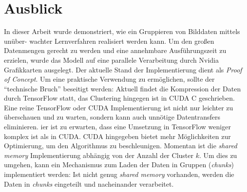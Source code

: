 \chapter{Ausblick}

In dieser Arbeit wurde demonstriert, wie ein Gruppieren von Bilddaten mittels unüber- wachter Lernverfahren realisiert werden kann. Um den großen Datenmengen gerecht zu werden und eine annehmbare Ausführungszeit zu erzielen, wurde das Modell auf eine parallele Verarbeitung durch Nvidia Grafikkarten ausgelegt. Der aktuelle Stand der Implementierung dient als \textit{Proof of Concept}. Um eine praktische Verwendung zu ermöglichen, sollte der \enquote{technische Bruch} beseitigt werden: Aktuell findet die Kompression der Daten durch TensorFlow statt, das Clustering hingegen ist in CUDA C geschrieben. Eine reine TensorFlow oder CUDA Implementierung ist nicht nur leichter zu überschauen und zu warten, sondern kann auch unnötige Datentransfers eliminieren. ier ist zu erwarten, dass eine Umsetzung in TensorFlow weniger komplex ist als in CUDA. CUDA hingegeben bietet mehr Möglichkeiten zur Optimierung, um den Algorithmus zu beschleunigen. Momentan ist die \textit{shared memory} Implementierung abhängig von der Anzahl der Cluster $k$. Um dies zu umgehen, kann ein Mechanismus zum Laden der Daten in Gruppen (\textit{chunks}) implementiert werden: Ist nicht genug \textit{shared memory} vorhanden, werden die Daten in \textit{chunks} eingeteilt und nacheinander verarbeitet.